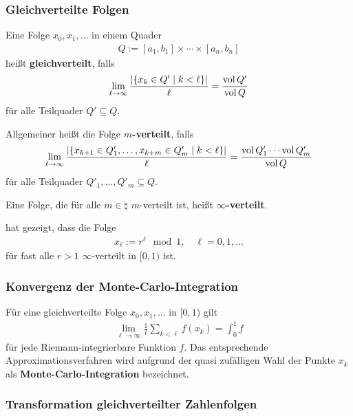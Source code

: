 \subsubsection{%
    Gleichverteilte Folgen%
}

Eine Folge $x_0, x_1, \dotsc$ in einem Quader
\begin{align*}
    Q := [a_1, b_1] \times \dotsb \times [a_n, b_n]
\end{align*}
heißt \textbf{gleichverteilt}, falls
\begin{align*}
    \lim_{\ell \to \infty} \frac{|\{x_k \in Q' \;|\; k < \ell\}|}{\ell}
    = \frac{\operatorname{vol} Q'}{\operatorname{vol} Q}
\end{align*}
für alle Teilquader $Q' \subseteq Q$.

Allgemeiner heißt die Folge \textbf{$m$-verteilt}, falls
\begin{align*}
    \lim_{\ell \to \infty} \frac{|\{x_{k+1} \in Q'_1, \dotsc, x_{k+m} \in Q'_m
    \;|\; k < \ell\}|}{\ell}
    = \frac{\operatorname{vol} Q'_1 \dotsm \operatorname{vol} Q'_m}{\operatorname{vol} Q}
\end{align*}
für alle Teilquader $Q'_1, \dotsc, Q'_m \subseteq Q$.

Eine Folge, die für alle $m \in \natural$ $m$-verteilt ist, heißt
\textbf{$\infty$-verteilt}.

\linie

 hat gezeigt, dass die Folge
\begin{align*}
    x_\ell := r^\ell \mod 1,\quad \ell = 0, 1, \dotsc
\end{align*}
für fast alle $r > 1$ $\infty$-verteilt in $[0, 1)$ ist.

\subsubsection{%
    Konvergenz der Monte-Carlo-Integration%
}

Für eine gleichverteilte Folge $x_0, x_1, \dotsc$ in $[0, 1)$ gilt
\begin{align*}
    \lim_{\ell \to \infty} \frac{1}{\ell} \sum_{k<\ell} f(x_k) = \int_0^1 f
\end{align*}
für jede Riemann-integrierbare Funktion $f$.
Das entsprechende Approximationsverfahren wird aufgrund der quasi zufälligen
Wahl der Punkte $x_k$ als \textbf{Monte-Carlo-Integration} bezeichnet.

\pagebreak

\subsubsection{%
    Transformation gleichverteilter Zahlenfolgen%
}

